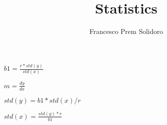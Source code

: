 \documentclass{article}
\author{Francesco Prem Solidoro}
\title{Statistics}
\begin{document}
\maketitle
  
$b1 = \frac{r * std(y)}{std(x)}$

$m=\frac{dy}{dx}$

$std(y) = b1 * std(x) / r$

$std(x) = \frac{std(y)*r}{b1}$
\end{document}
